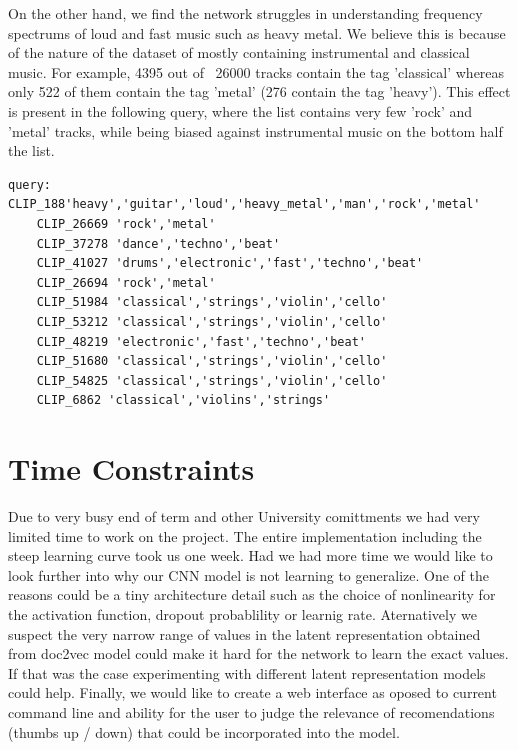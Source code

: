 \documentclass[11pt, a4paper]{article}
\begin{document}
    \noindent
    On the other hand, we find the network struggles in understanding frequency
    spectrums of loud and fast music such as heavy metal. We believe this is
    because of the nature of the dataset of mostly containing instrumental and
    classical music. For example, 4395 out of ~26000 tracks contain the tag
    'classical' whereas only 522 of them contain the tag 'metal' (276 contain the
    tag 'heavy'). This effect is present in the following query, where the list
    contains very few 'rock' and 'metal' tracks, while being biased against
    instrumental music on the bottom half the list.

    \begin{Verbatim}[xleftmargin=.5in]
    query: CLIP_188'heavy','guitar','loud','heavy_metal','man','rock','metal'
    CLIP_26669 'rock','metal'
    CLIP_37278 'dance','techno','beat'
    CLIP_41027 'drums','electronic','fast','techno','beat'
    CLIP_26694 'rock','metal'
    CLIP_51984 'classical','strings','violin','cello'
    CLIP_53212 'classical','strings','violin','cello'
    CLIP_48219 'electronic','fast','techno','beat'
    CLIP_51680 'classical','strings','violin','cello'
    CLIP_54825 'classical','strings','violin','cello'
    CLIP_6862 'classical','violins','strings'
    \end{Verbatim}

  \section{Time Constraints}
    Due to very busy end of term and other University comittments we had very
    limited time to work on the project. The entire implementation including
    the steep learning curve took us one week. Had we had more time we would
    like to look further into why our CNN model is not learning to generalize.
    One of the reasons could be a tiny architecture detail such as the choice
    of nonlinearity for the activation function, dropout probablility or
    learnig rate. Aternatively we suspect the very narrow range of values in
    the latent representation obtained from doc2vec model could make it hard
    for the network to learn the exact values. If that was the case
    experimenting with different latent representation models could help.
    Finally, we would like to create a web interface as oposed to current
    command line and ability for the user to judge the relevance of
    recomendations (thumbs up / down) that could be incorporated into the
    model.
    
\end{document}
